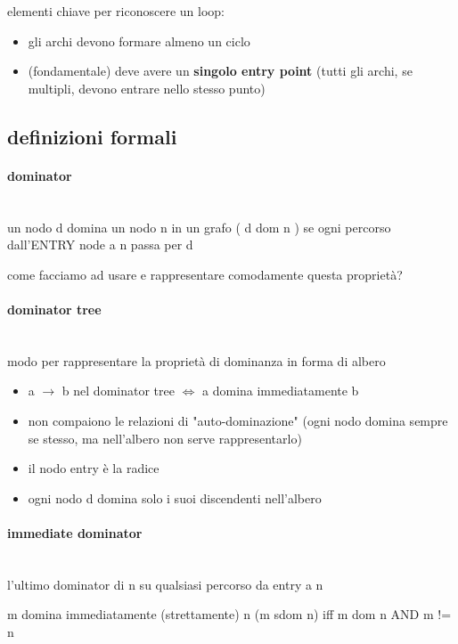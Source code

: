 elementi chiave per riconoscere un loop:
\begin{itemize}
  \item gli archi devono formare almeno un ciclo
  \item (fondamentale) deve avere un \textbf{singolo entry point} (tutti gli archi, se multipli, devono entrare nello stesso punto)
\end{itemize}

\subsection{definizioni formali}

\paragraph{dominator}~\\

un nodo d domina un nodo n in un grafo ( d dom n ) se ogni percorso dall'ENTRY node a n passa per d

come facciamo ad usare e rappresentare comodamente questa propriet\`a?

\paragraph{dominator tree}~\\

modo per rappresentare la propriet\`a di dominanza in forma di albero

\begin{itemize}
  \item a $\rightarrow$ b nel dominator tree $\iff$ a domina immediatamente b
  \item non compaiono le relazioni di "auto-dominazione" (ogni nodo domina sempre se stesso, ma nell'albero non serve rappresentarlo)
  \item il nodo entry \`e la radice
  \item ogni nodo d domina solo i suoi discendenti nell'albero
\end{itemize}

\paragraph{immediate dominator}~\\

l'ultimo dominator di n su qualsiasi percorso da entry a n

m domina immediatamente (strettamente) n (m sdom n) iff m dom n AND m != n

